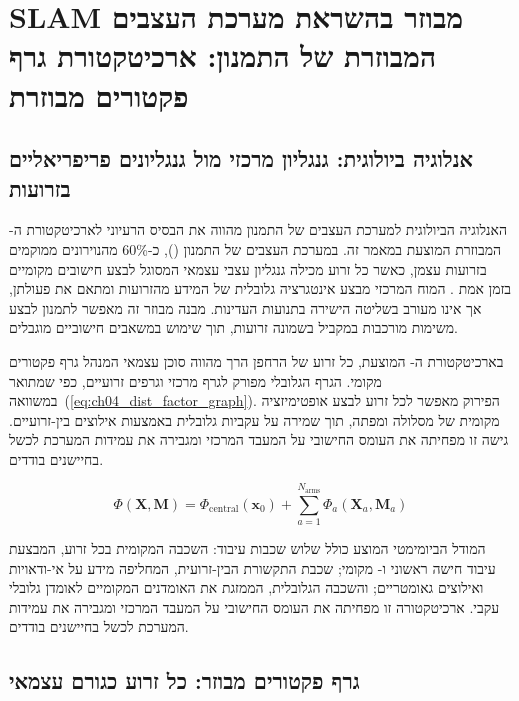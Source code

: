 

\section{SLAM מבוזר בהשראת מערכת העצבים המבוזרת של התמנון: ארכיטקטורת גרף פקטורים מבוזרת}
\label{sec:ch04_distributed_slam}

\subsection{אנלוגיה ביולוגית: גנגליון מרכזי מול גנגליונים פריפריאליים בזרועות}
\label{sec:ch04_biological_analogy}

האנלוגיה הביולוגית למערכת העצבים של התמנון מהווה את הבסיס הרעיוני לארכיטקטורת ה- המבוזרת המוצעת במאמר זה. במערכת העצבים של התמנון (), כ-60\% מהנוירונים ממוקמים בזרועות עצמן, כאשר כל זרוע מכילה גנגליון עצבי עצמאי המסוגל לבצע חישובים מקומיים בזמן אמת \cite{Sumanaweera2026}. המוח המרכזי מבצע אינטגרציה גלובלית של המידע מהזרועות ומתאם את פעולתן, אך אינו מעורב בשליטה הישירה בתנועות העדינות. מבנה מבוזר זה מאפשר לתמנון לבצע משימות מורכבות במקביל בשמונה זרועות, תוך שימוש במשאבים חישוביים מוגבלים.

בארכיטקטורת ה- המוצעת, כל זרוע של הרחפן הרך מהווה סוכן  עצמאי המנהל גרף פקטורים מקומי. הגרף הגלובלי מפורק לגרף מרכזי וגרפים זרועיים, כפי שמתואר במשוואה~(\ref{eq:ch04_dist_factor_graph}). הפירוק מאפשר לכל זרוע לבצע אופטימיזציה מקומית של מסלולה ומפתה, תוך שמירה על עקביות גלובלית באמצעות אילוצים בין-זרועיים. גישה זו מפחיתה את העומס החישובי על המעבד המרכזי ומגבירה את עמידות המערכת לכשל בחיישנים בודדים.

\begin{equation}
\Phi(\mathbf{X}, \mathbf{M}) = \Phi_{\text{central}}(\mathbf{x}_0) + \sum_{a=1}^{N_{\text{arms}}} \Phi_a(\mathbf{X}_a, \mathbf{M}_a)
\label{eq:ch04_dist_factor_graph}
\end{equation}

המודל הביומימטי המוצע כולל שלוש שכבות עיבוד: השכבה המקומית בכל זרוע, המבצעת עיבוד חישה ראשוני ו- מקומי; שכבת התקשורת הבין-זרועית, המחליפה מידע על אי-ודאויות ואילוצים גאומטריים; והשכבה הגלובלית, הממזגת את האומדנים המקומיים לאומדן גלובלי עקבי. ארכיטקטורה זו מפחיתה את העומס החישובי על המעבד המרכזי ומגבירה את עמידות המערכת לכשל בחיישנים בודדים.

\subsection{גרף פקטורים מבוזר: כל זרוע כגורם  עצמאי}
\label{sec:ch04_factor_graph}

